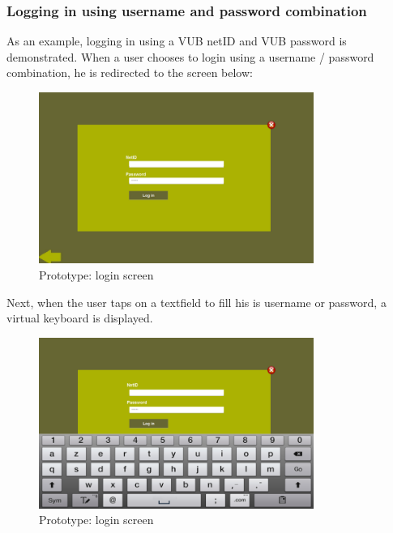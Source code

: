 \documentclass[11pt, a4paper,svglistings]{report}
\begin{document}
\newpage

\subsubsection{Logging in using username and password combination}

As an example, logging in using a VUB netID and VUB password is demonstrated. When a user chooses to login using a username / password combination, he is redirected to the screen below:


\begin{figure}[H]
\centering
    \includegraphics[width=0.8\textwidth]{Prototypes/LoginNamePass.png}
  \caption{Prototype: login screen}
\end{figure}
Next, when the user taps on a textfield to fill his is username or password, a virtual keyboard is displayed.


\begin{figure}[H]
\centering
    \includegraphics[width=0.8\textwidth]{Prototypes/LoginNamePassKeyboard.png}
  \caption{Prototype: login screen}
\end{figure}

\end{document}
